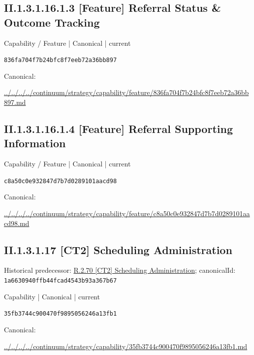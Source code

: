 \documentclass[10pt,a4paper]{article}
\begin{document}
\subsection*{II.1.3.1.16.1.3 [Feature] Referral Status \& Outcome Tracking}
\label{element-836fa704f7b24bfc8f7eeb72a36bb897}
{\small Capability / Feature | Canonical | current}\par
\texttt{836fa704f7b24bfc8f7eeb72a36bb897}\par
Canonical: \par
{\footnotesize\url{../../../../continuum/strategy/capability/feature/836fa704f7b24bfc8f7eeb72a36bb897.md}}\par
\subsection*{II.1.3.1.16.1.4 [Feature] Referral Supporting Information}
\label{element-c8a50c0e932847d7b7d0289101aacd98}
{\small Capability / Feature | Canonical | current}\par
\texttt{c8a50c0e932847d7b7d0289101aacd98}\par
Canonical: \par
{\footnotesize\url{../../../../continuum/strategy/capability/feature/c8a50c0e932847d7b7d0289101aacd98.md}}\par
\subsection*{II.1.3.1.17 [CT2] Scheduling Administration}
Historical predecessor: \hyperref[element-1a6630940ffb44fcad4543b93a367b67]{R.2.70 [CT2] Scheduling Administration}; canonicalId: \texttt{1a6630940ffb44fcad4543b93a367b67}\par
\label{element-35fb3744c900470f9895056246a13fb1}
{\small Capability | Canonical | current}\par
\texttt{35fb3744c900470f9895056246a13fb1}\par
Canonical: \par
{\footnotesize\url{../../../../continuum/strategy/capability/35fb3744c900470f9895056246a13fb1.md}}\par
\end{document}
